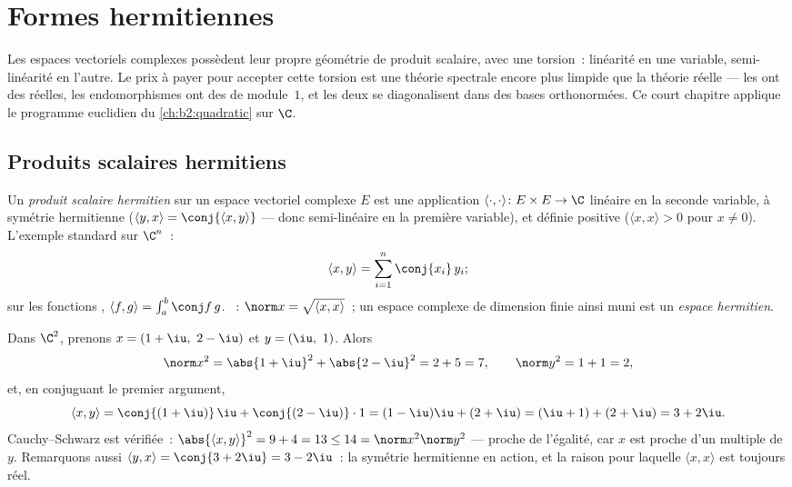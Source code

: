 \chapter{Formes hermitiennes}\label{ch:b2:hermitian}

Les espaces vectoriels complexes possèdent leur propre géométrie de
produit scalaire, avec une torsion~: linéarité en une variable,
semi-linéarité en l'autre. Le prix à payer pour accepter cette torsion
est une théorie spectrale encore plus limpide que la théorie réelle
--- les  ont des  réelles, les
endomorphismes  ont des  de module~$1$, et les
deux se diagonalisent dans des bases orthonormées. Ce court chapitre
applique le programme euclidien du \cref{ch:b2:quadratic} sur $\C$.

\section{Produits scalaires hermitiens}

\begin{definition}\label{def:b2:hermitian:def}
Un \emph{produit scalaire hermitien}
sur un espace vectoriel complexe $E$ est une application
$\langle\cdot,\cdot\rangle \colon E \times E \to \C$ linéaire en la
seconde variable, à symétrie hermitienne ($\langle y, x\rangle =
\conj{\langle x, y\rangle}$ --- donc semi-linéaire en la première
variable), et définie positive ($\langle x, x\rangle > 0$ pour $x \neq
0$). L'exemple standard sur $\C^n$~:
\[
\langle x, y \rangle = \sum_{i=1}^{n} \conj{x_i}\, y_i ;
\]
sur les fonctions , $\langle f, g\rangle = \int_a^b \conj
f\,g$. ~: $\norm x = \sqrt{\langle x,x\rangle}$~; un espace
complexe de dimension finie ainsi muni est un \emph{espace
hermitien}.
\end{definition}

\begin{example}\label{ex:b2:hermitian:firstcomp}
Dans $\C^2$, prenons $x = (1+\iu,\ 2-\iu)$ et $y = (\iu,\ 1)$.
Alors
\[
\norm x^2 = \abs{1+\iu}^2 + \abs{2-\iu}^2 = 2 + 5 = 7,
\qquad
\norm y^2 = 1 + 1 = 2,
\]
et, en conjuguant le premier argument,
\[
\langle x, y\rangle
= \conj{(1+\iu)}\,\iu + \conj{(2-\iu)}\cdot1
= (1-\iu)\iu + (2+\iu)
= (\iu + 1) + (2 + \iu) = 3 + 2\iu .
\]
Cauchy--Schwarz est vérifiée~: $\abs{\langle x, y\rangle}^2 = 9 +
4 = 13 \leq 14 = \norm x^2\norm y^2$ --- proche de l'égalité,
car $x$ est proche d'un multiple de $y$. Remarquons aussi
$\langle y, x\rangle = \conj{3 + 2\iu} = 3 - 2\iu$~: la symétrie
hermitienne en action, et la raison pour laquelle $\langle x,
x\rangle$ est toujours réel.
\end{example}

